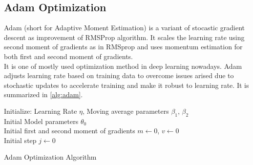 \subsection{Adam Optimization}
Adam \cite{kingma_adam_2017}  (short for Adaptive Moment Estimation) is a variant of stocastic gradient descent as improvement of RMSProp \cite{hinton_lecture_nodate} algorithm. It scales the learning rate using second moment of gradients as in RMSprop and uses momentum estimation for both first and second moment of gradients. \\
It is one of mostly used optimization method in deep learning nowadays. Adam adjusts learning rate based on training data to overcome issues arised due to stochastic updates to accelerate training and make it robust to learning rate. It is summarized in \ref{alg:adam}. \\
\begin{algorithm}[H]
	\SetAlgoLined
	\DontPrintSemicolon %
	Initialize: Learning Rate $\eta$, Moving average parameters $\beta_1$, $\beta_2$\\
	Initial Model parameters $\theta_0$ \\
	Initial first and second moment of gradients $m \leftarrow 0$, $v \leftarrow 0$ \\
	Initial step $j \leftarrow 0$ \\
	\caption{Adam Optimization Algorithm}
	\label{alg:adam}
\end{algorithm}